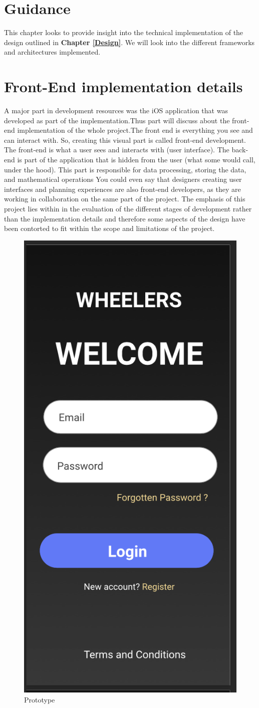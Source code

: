 \documentclass{l4proj}
\begin{document}
\section{Guidance}
This chapter looks to provide insight into the technical implementation of the design outlined in \textbf{Chapter \ref{Design}}. We will look into the different frameworks and architectures implemented.

\section{Front-End implementation details}
A major part in development resources was the iOS application that was developed as part of the implementation.Thus part will discuss about the front-end implementation of the whole project.The front end is everything you see and can interact with. So, creating this visual part is called front-end development. The front-end is what a user sees and interacts with (user interface). The back-end is part of the application that is hidden from the user (what some would call, under the hood). This part is responsible for data processing, storing the data, and mathematical operations You could even say that designers creating user interfaces and planning experiences are also front-end developers, as they are working in collaboration on the same part of the project. The emphasis of this project lies within in the evaluation of the different stages of development rather than the implementation details and therefore some aspects of the design have been contorted to fit within the scope and limitations of the project.

\begin{figure}
    \centering
     \includegraphics[width=.3\textwidth]{images/Screenshot 2022-02-15 at 1.49.53 pm.png}
     \caption{Prototype}
    \label{fig:my_label}
\end{figure}
\end{document}
